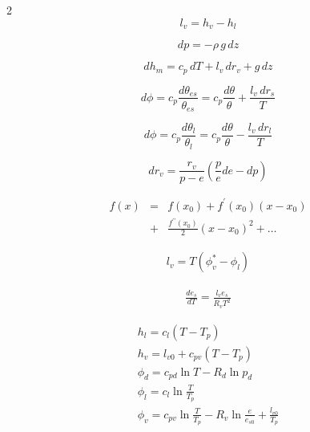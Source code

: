 \documentclass[12pt]{article}
\begin{document}
\begin{multicols}{2}
\begin{equation}
l_v = h_v - h_l
\end{equation}


\begin{equation}
dp = - \rho\,g\,dz
\label{eq:hydro}
\end{equation}


\begin{equation}
\label{eq:moist}
  dh_m = c_p\,dT + l_v\,dr_v + g\,dz
\end{equation}

\begin{equation}
\label{eq:thetaes}
  d\phi = c_p \frac{d\theta_{es}}{\theta_{es}} = c_p \frac{d\theta}{\theta} + \frac{l_v\,dr_s}{T}
\end{equation}

\begin{equation}
  d\phi = c_p \frac{d\theta_l}{\theta_l} = c_p \frac{d\theta}{\theta} - \frac{l_v\,dr_l}{T}
\end{equation}


\begin{equation}
  \label{eq:wdiff}
  d r_v = \frac{r_v}{p-e} \left ( \frac{p}{e} de - dp \right )
\end{equation}

\begin{eqnarray}
  \label{eq:taylor}
  f(x)  &=& f(x_0) + f^\prime(x_0)(x - x_0) \nonumber\\ 
        &+&  \frac{f^{\prime\prime}(x_0)}{2}(x-x_0)^2 +  \ldots
\end{eqnarray}

\begin{gather}
\label{eq:cc}
  l_v = T (\phi_v^* - \phi_l)
\end{gather}

\begin{gather}
  \frac{de_s }{dT} = \frac{l_v e_s}{R_v T^2} 
\end{gather}


\begin{subequations}
  \begin{eqnarray}
  h_l = c_l (T - T_p) \\
 h_v = l_{v0} + c_{pv} ( T - T_p) \\
\phi_d = c_{pd} \ln T - R_d \ln p_d \label{eq:dryentrop}\\
 \phi_l = c_l \ln \frac{T }{T_p}  \\
\phi_v = c_{pv} \ln \frac{T }{T_p} - R_v \ln \frac{e }{e_{s0}} + \frac{l_{v0} }{T_p}  
\label{eq:sdef}
  \end{eqnarray}
\end{subequations}



\end{multicols}
\end{document}
